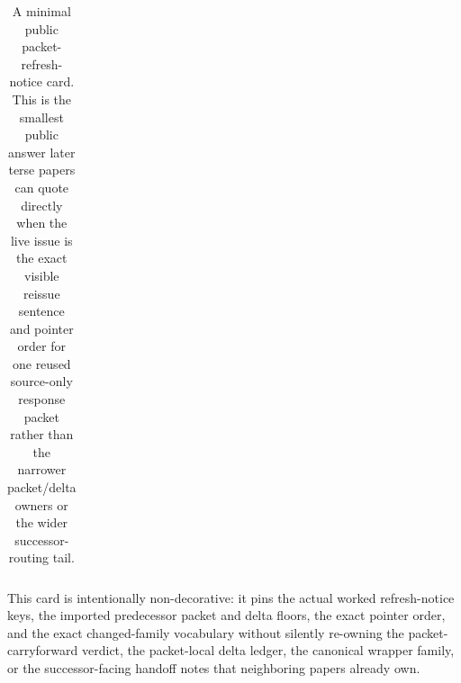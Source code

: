 \documentclass[11pt]{article}
\begin{document}
\begin{table}[t]
\begin{tabularx}{\linewidth}{@{}lX@{}}
\bottomrule
\end{tabularx}
\caption{A minimal public packet-refresh-notice card. This is the smallest public answer later terse papers can quote directly when the live issue is the exact visible reissue sentence and pointer order for one reused source-only response packet rather than the narrower packet/delta owners or the wider successor-routing tail.}
\label{tab:minimal-public-packet-refresh-notice-card}
\end{table}

This card is intentionally non-decorative: it pins the actual worked refresh-notice keys, the imported predecessor packet and delta floors, the exact pointer order, and the exact changed-family vocabulary without silently re-owning the packet-carryforward verdict, the packet-local delta ledger, the canonical wrapper family, or the successor-facing handoff notes that neighboring papers already own.\cite{series:workedexample}
\end{document}
